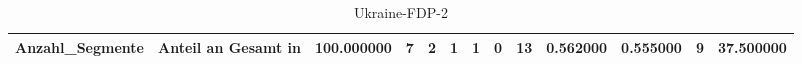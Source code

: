 \begin{table}
\caption{Ukraine-FDP-2}
\label{tab:meine_tabelle}
\begin{tabular}{rrrrrrrrrrrr}
\toprule
Anzahl_Segmente & Anteil an Gesamt in %
 & 100.000000 & 7 & 2 & 1 & 1 & 0 & 13 & 0.562000 & 0.555000 & 9 & 37.500000 \\
\bottomrule
\end{tabular}
\end{table}
